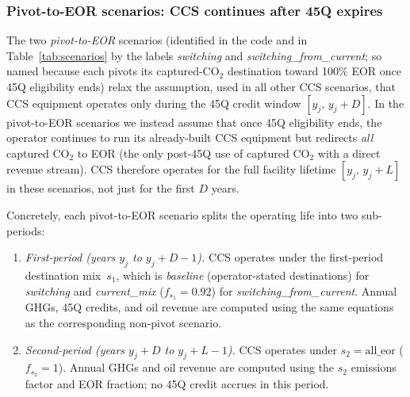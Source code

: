 \documentclass[11pt]{article}
\newcommand{\cotwo}{\ensuremath{\mathrm{CO_2}}}
\begin{document}
\subsubsection{Pivot-to-EOR scenarios: CCS continues after 45Q expires}
\label{sec:pivot_to_eor_scenarios}

The two \emph{pivot-to-EOR} scenarios (identified in the code and in Table~\ref{tab:scenarios} by the labels \emph{switching} and \emph{switching\_from\_current}; so named because each pivots its captured-\cotwo{} destination toward 100\% EOR once 45Q eligibility ends) relax the assumption, used in all other CCS scenarios, that CCS equipment operates only during the 45Q credit window $[y_j,\,y_j + D]$. In the pivot-to-EOR scenarios we instead assume that once 45Q eligibility ends, the operator continues to run its already-built CCS equipment but redirects \emph{all} captured \cotwo{} to EOR (the only post-45Q use of captured \cotwo{} with a direct revenue stream). CCS therefore operates for the full facility lifetime $[y_j,\,y_j + L]$ in these scenarios, not just for the first $D$ years.

Concretely, each pivot-to-EOR scenario splits the operating life into two sub-periods:
\begin{enumerate}
  \item \emph{First-period (years $y_j$ to $y_j + D - 1$).} CCS operates under the first-period destination mix~$s_1$, which is \emph{baseline} (operator-stated destinations) for \emph{switching} and \emph{current\_mix} ($f_{s_1} = 0.92$) for \emph{switching\_from\_current}. Annual GHGs, 45Q credits, and oil revenue are computed using the same equations as the corresponding non-pivot scenario.
  \item \emph{Second-period (years $y_j + D$ to $y_j + L - 1$).} CCS operates under $s_2 = \text{all\_eor}$ ($f_{s_2} = 1$). Annual GHGs and oil revenue are computed using the $s_2$ emissions factor and EOR fraction; no 45Q credit accrues in this period.
\end{enumerate}
\end{document}
